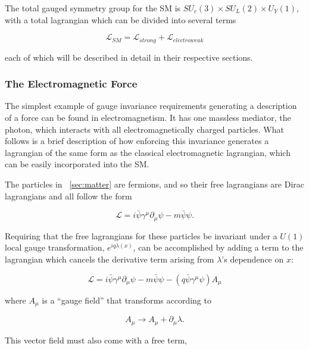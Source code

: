 The total gauged symmetry group for the \ac{SM} is $SU_c(3) \times SU_L(2) \times U_Y(1)$, with a total lagrangian which can be divided into several terms

\begin{equation}
\mathcal{L}_{SM} = \mathcal{L}_{strong} + \mathcal{L}_{electroweak}
\end{equation}

each of which will be described in detail in their respective sections. 

\subsubsection{The Electromagnetic Force}
\label{sec:em}

The simplest example of gauge invariance requirements generating a description of a force can be found in electromagnetism. It has one massless mediator, the photon, which interacts with all electromagnetically charged particles. What follows is a brief description of how enforcing this invariance generates a lagrangian of the same form as the classical electromagnetic lagrangian, which can be easily incorporated into the \ac{SM}. 

The particles in ~\autoref{sec:matter} are fermions, and so their free lagrangians are Dirac lagrangians and all follow the form

\begin{equation}
\mathcal{L} = i\bar{\psi}\gamma^\mu \partial_\mu\psi - m \bar{\psi}\psi . 
\end{equation}

Requiring that the free lagrangians for these particles be invariant under a $U(1)$ local gauge transformation, $e^{iq\lambda(x)}$, can be accomplished by adding a term to the lagrangian which cancels the derivative term arising from $\lambda$'s dependence on $x$: 

\begin{equation}
\mathcal{L} = i\bar{\psi}\gamma^\mu \partial_\mu\psi - m \bar{\psi}\psi - (q\bar{\psi}\gamma^\mu\psi)A_\mu
\end{equation}

where $A_\mu$ is a ``gauge field'' that transforms according to 

\begin{equation}
A_\mu \rightarrow A_\mu + \partial_\mu \lambda . 
\end{equation}

This vector field must also come with a free term, 

